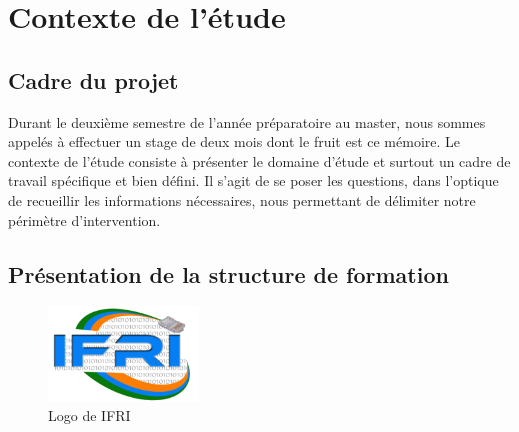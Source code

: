 \documentclass[12pt]{report}
\begin{document}
  \pageDeGarde



  
  



  \tableofcontents

  \listoffigures 

  \listoftables

  \clearpage
  \setcounter{page}{1}

  \renewcommand*{\glossaryname}{Glossaire}
  
  \glsaddall
  \printglossaries

  

  \lhead[]{} \rhead[]{} \chead[]{}

  

  \fancyhead[L]{\tiny \leftmark}
  \fancyhead[R]{\scriptsize \rightmark}
  \fancyfoot[C]{\thepage}
  
  \chapter{Contexte de l'étude}
    \section{Cadre du projet}
      Durant le deuxième semestre de l'année préparatoire au master, nous sommes appelés à effectuer un stage de deux mois dont le fruit est ce mémoire. Le contexte de l'étude consiste à présenter le domaine d'étude et surtout un cadre de travail spécifique et bien défini. Il s'agit de se poser les questions, dans l'optique de recueillir les informations nécessaires, nous permettant de délimiter notre périmètre d'intervention.
      
    \section{Présentation de la structure de formation}
      \begin{figure}[H]
	\begin{center}
	  \includegraphics[scale=0.6, width=4cm]{images/logoIfri.png}
	    \caption{Logo de IFRI}
	\end{center}
      \end{figure}
\end{document}
